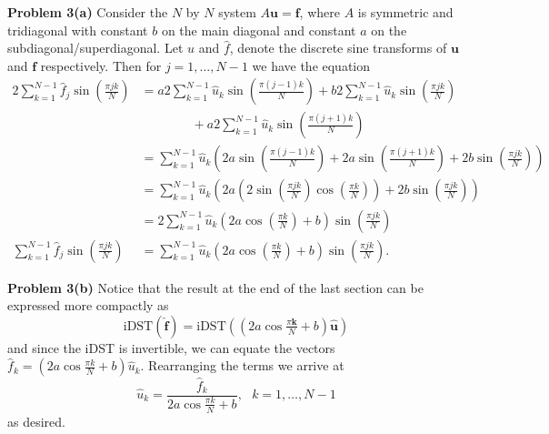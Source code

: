 \documentclass[12pt]{article}
\newcommand{\problem}[1]{\hspace{-4 ex} \large \textbf{Problem #1} }
\renewcommand{\vec}[1]{\boldsymbol{\mathbf{#1}}}
\begin{document}
\problem{3(a)} Consider the $N$ by $N$ system $A \vec{u} = \vec{f}$, where $A$ is symmetric and tridiagonal with constant $b$ on the main diagonal and constant $a$ on the subdiagonal/superdiagonal. Let $\hat{u}$ and $\hat{f}$, denote the discrete sine transforms of $\vec{u}$ and $\vec{f}$ respectively. Then for $j = 1, ..., N-1$ we have the equation
\begin{align*}
	2\sum\limits_{k=1}^{N-1} \hat{f}_{j} \sin \left(\tfrac{\pi jk}{N}\right) &= a2\sum\limits_{k=1}^{N-1} \hat{u}_{k} \sin \left(\tfrac{\pi (j-1)k}{N}\right) + b2 \sum\limits_{k=1}^{N-1} \hat{u}_k \sin \left(\tfrac{\pi jk}{N} \right)  \\
	&\phantom{===} + a2\sum\limits_{k=1}^{N-1} \hat{u}_{k} \sin \left(\tfrac{\pi (j+1)k}{N} \right) \\
	& = \sum\limits_{k=1}^{N-1} \hat{u}_{k} \left( 2a \sin \left(\tfrac{\pi (j-1)k}{N}\right) + 2a \sin \left(\tfrac{\pi (j+1)k}{N}\right)  + 2b \sin \left(\tfrac{\pi jk}{N} \right) \right) \\
	& = \sum\limits_{k=1}^{N-1} \hat{u}_{k} \left( 2a \left( 2\sin \left(\tfrac{\pi jk}{N}\right) \cos \left(\tfrac{\pi k}{N}\right) \right) + 2b \sin \left(\tfrac{\pi jk}{N} \right) \right) \\
	& = 2 \sum\limits_{k=1}^{N-1} \hat{u}_{k} \left( 2a\cos \left(\tfrac{\pi k}{N}\right) +b \right) \sin \left(\tfrac{\pi jk}{N}\right)\\
	\sum\limits_{k=1}^{N-1} \hat{f}_{j} \sin \left(\tfrac{\pi jk}{N}\right) &= \sum\limits_{k=1}^{N-1} \hat{u}_{k} \left( 2a\cos \left(\tfrac{\pi k}{N}\right) +b \right) \sin \left(\tfrac{\pi jk}{N}\right) \text{.}
\end{align*}

\bigbreak

\problem{3(b)} Notice that the result at the end of the last section can be expressed more compactly as
$$
\text{iDST}(\hat{\vec{f}}) = \text{iDST}\left( \left(2a\cos \tfrac{\pi \vec{k}}{N} +b\right) \hat{\vec{u}} \right)
$$
and since the iDST is invertible, we can equate the vectors $\hat{f}_k = \left(2a\cos \tfrac{\pi k}{N} +b\right) \hat{u}_k$. Rearranging the terms we arrive at
$$
\hat{u}_k = \frac{\hat{f}_k}{2a\cos \tfrac{\pi k}{N} +b}, \ \ \ k=1,\dots, N-1
$$
as desired.
\end{document}
